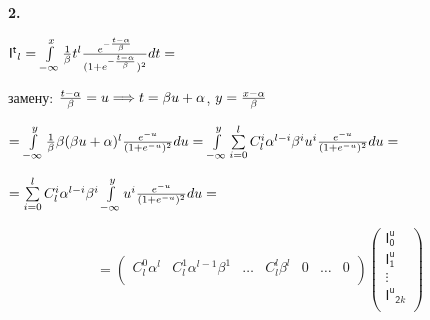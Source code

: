 \documentclass[a4paper,12pt]{article}
\begin{document}
\noindent\textbf{2.}

\begin{center}
    $\mathsf{I^t}_l = \int\limits_{-\infty}^x {1\over{\beta}} t^l {e^{-{t - \alpha\over{\beta}}}\over{(1 + e^{-{t - \alpha\over{\beta}}}})^2} d t = $
\end{center}

 замену: ${t - \alpha\over{\beta}} = u \Longrightarrow t = \beta u + \alpha$, $y = {x - \alpha\over{\beta}}$

\begin{center}
    $= \int\limits_{-\infty}^y {1\over{\beta}} \beta (\beta u + \alpha)^l {e^{-u}\over{(1 + e^{-u}})^2} d u = \int\limits_{-\infty}^y \sum\limits_{i = 0}^l C_l^i \alpha^{l - i} \beta^i u^i {e^{-u}\over{(1 + e^{-u}})^2} d u = $
\end{center}

\begin{center}
    $= \sum\limits_{i = 0}^l C_l^i \alpha^{l - i} \beta^{i}  \int\limits_{-\infty}^y u^i {e^{-u}\over{(1 + e^{-u}})^2} d u =$
\end{center}

\begin{displaymath}
    = \begin{pmatrix}
        C_l^0 \alpha^l & C_l^1 \alpha^{l - 1} \beta^1 & \ldots & C_l^l \beta^{l} & 0 & \ldots & 0 \\
    \end{pmatrix} \begin{pmatrix}
        \mathsf{I^u_0} \\ \mathsf{I^u_1} \\ \vdots \\ \mathsf{I^u}_{\mathsf{2}k} \\
    \end{pmatrix}
\end{displaymath}

\end{document}
